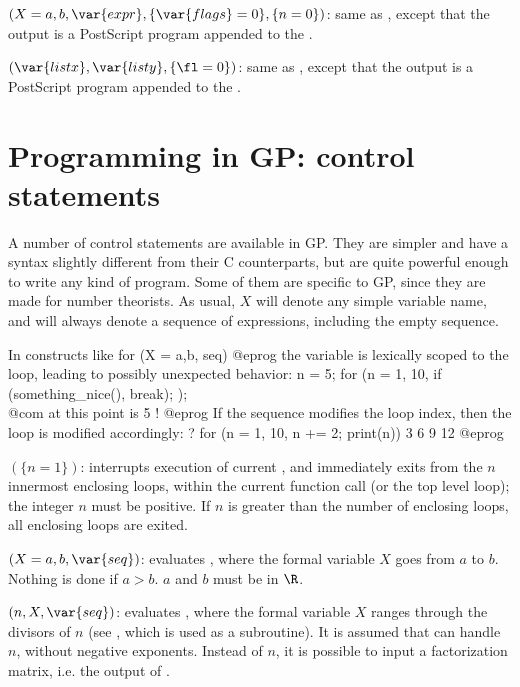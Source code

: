 $(X=a,b,\var{expr},\{\var{flags}=0\},\{n=0\})$: \label{se:psploth}same as , except that the output is a PostScript program
appended to the .

$(\var{listx},\var{listy},\{\fl=0\})$: \label{se:psplothraw}same as , except that the output is a PostScript program
appended to the .

\section{Programming in GP: control statements}
\label{se:programming}

  A number of control statements are available in GP. They are simpler and
have a syntax slightly different from their C counterparts, but are quite
powerful enough to write any kind of program. Some of them are specific to
GP, since they are made for number theorists. As usual, $X$ will denote any
simple variable name, and  will always denote a sequence of
expressions, including the empty sequence.

 In constructs like
\bprog
    for (X = a,b, seq)
@eprog\noindent
the variable  is lexically scoped to the loop, leading to possibly
unexpected behavior:
\bprog
    n = 5;
    for (n = 1, 10,
      if (something_nice(), break);
    );
    \\ @com at this point  is 5 !
@eprog\noindent
If the sequence  modifies the loop index, then the loop
is modified accordingly:
\bprog
    ? for (n = 1, 10, n += 2; print(n))
    3
    6
    9
    12
@eprog


$(\{n=1\})$: \label{se:break}interrupts execution of current , and
immediately exits from the $n$ innermost enclosing loops, within the
current function call (or the top level loop); the integer $n$ must be
positive. If $n$ is greater than the number of enclosing loops, all
enclosing loops are exited.

$(X=a,b,\var{seq})$: \label{se:for}evaluates , where
the formal variable $X$ goes from $a$ to $b$. Nothing is done if $a>b$.
$a$ and $b$ must be in $\R$.

$(n,X,\var{seq})$: \label{se:fordiv}evaluates , where
the formal variable $X$ ranges through the divisors of $n$
(see , which is used as a subroutine). It is assumed that
 can handle $n$, without negative exponents. Instead of $n$,
it is possible to input a factorization matrix, i.e. the output of
.


